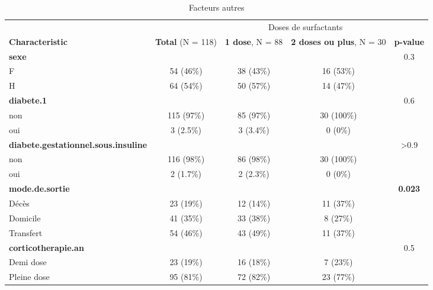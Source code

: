\documentclass[
  10pt,
  a4paper,
]{scrartcl}
\begin{document}
\begin{table}

\caption{\label{tab:princ1}Facteurs autres}
\centering
\begin{tabular}[t]{l|c|c|c|c}
\hline
\multicolumn{2}{c|}{ } & \multicolumn{2}{c|}{Doses de surfactants} & \multicolumn{1}{c}{ } \\
\cline{3-4}
\textbf{Characteristic} & \textbf{Total} (N = 118) & \textbf{1 dose}, N = 88 & \textbf{2 doses ou plus}, N = 30 & \textbf{p-value}\\
\hline
\textbf{sexe} &  &  &  & 0.3\\
\hline
\hspace{1em}F & 54 (46\%) & 38 (43\%) & 16 (53\%) & \\
\hline
\hspace{1em}H & 64 (54\%) & 50 (57\%) & 14 (47\%) & \\
\hline
\textbf{diabete.1} &  &  &  & 0.6\\
\hline
\hspace{1em}non & 115 (97\%) & 85 (97\%) & 30 (100\%) & \\
\hline
\hspace{1em}oui & 3 (2.5\%) & 3 (3.4\%) & 0 (0\%) & \\
\hline
\textbf{diabete.gestationnel.sous.insuline} &  &  &  & >0.9\\
\hline
\hspace{1em}non & 116 (98\%) & 86 (98\%) & 30 (100\%) & \\
\hline
\hspace{1em}oui & 2 (1.7\%) & 2 (2.3\%) & 0 (0\%) & \\
\hline
\textbf{mode.de.sortie} &  &  &  & \textbf{0.023}\\
\hline
\hspace{1em}Décès & 23 (19\%) & 12 (14\%) & 11 (37\%) & \\
\hline
\hspace{1em}Domicile & 41 (35\%) & 33 (38\%) & 8 (27\%) & \\
\hline
\hspace{1em}Transfert & 54 (46\%) & 43 (49\%) & 11 (37\%) & \\
\hline
\textbf{corticotherapie.an} &  &  &  & 0.5\\
\hline
\hspace{1em}Demi dose & 23 (19\%) & 16 (18\%) & 7 (23\%) & \\
\hline
\hspace{1em}Pleine dose & 95 (81\%) & 72 (82\%) & 23 (77\%) & \\

\end{tabular}
\end{table}
\end{document}
